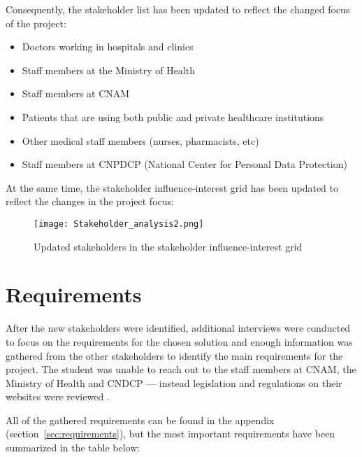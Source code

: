 Consequently, the stakeholder list has been updated to reflect the changed focus of the project:
\begin{itemize}
    \item Doctors working in hospitals and clinics
    \item Staff members at the Ministry of Health
    \item Staff members at CNAM
    \item Patients that are using both public and private healthcare institutions
    \item Other medical staff members (nurses, pharmacists, etc)
    \item Staff members at CNPDCP (National Center for Personal Data Protection)
\end{itemize}

At the same time, the stakeholder influence-interest grid has been updated to reflect the changes in the project focus:

\begin{figure}[ht]
    \centering
    \texttt{[image: Stakeholder\_analysis2.png]}
    \caption{Updated stakeholders in the stakeholder influence-interest grid}\label{fig:stakeholder_analysis2}
\end{figure}

\clearpage

\section{Requirements}

After the new stakeholders were identified, additional interviews were conducted to focus on the requirements for the chosen solution and enough information was gathered from the other stakeholders to identify the main requirements for the project. The student was unable to reach out to the staff members at CNAM, the Ministry of Health and CNDCP --- instead legislation and regulations on their websites were reviewed \parencite{CNAM,CNPDCP,ministry}. 

All of the gathered requirements can be found in the appendix (section~\ref{sec:requirements}), but the most important requirements have been summarized in the table below:

